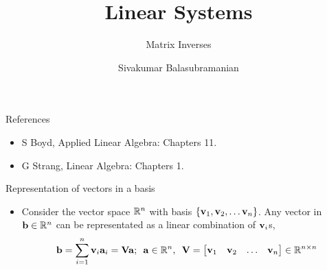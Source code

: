 \documentclass[aspectratio=169]{beamer}
\title{Linear Systems}
\subtitle{Matrix Inverses}
\author{Sivakumar Balasubramanian}
\institute[Christian Medical College] %
{
  \inst{}%
  Department of Bioengineering\\
  Christian Medical College, Bagayam\\
  Vellore 632002
}
\date{}
\def\mf{\ensuremath\mathbf}
\def\mb{\ensuremath\mathbb}
\begin{document}
\begin{frame}
  \titlepage
\end{frame}

\begin{frame}[t]{References}
\begin{itemize}
  \item S Boyd, Applied Linear Algebra: Chapters 11.
  \item G Strang, Linear Algebra: Chapters 1.
\end{itemize}
\end{frame}


\begin{frame}[t]{Representation of vectors in a basis}
\vspace{-0.25cm}
\begin{small}
\begin{itemize}
\item Consider the vector space $\mb{R}^n$ with basis $\left\{\mf{v}_1, \mf{v}_2, \ldots \mf{v}_n\right\}$. Any vector in $\mf{b} \in \mb{R}^n$ can be representated as a linear combination of $\mf{v}_i$s,
\[ \mf{b} = \sum_{i=1}^{n} \mf{v}_i\mf{a}_i = \mf{V}\mf{a}; \,\,\, \mf{a} \in \mb{R}^n, \,\,\, \mf{V} = \begin{bmatrix*}\mf{v}_1 & \mf{v}_2 & \ldots & \mf{v}_n\end{bmatrix*} \in \mb{R}^{n \times n} \]


\end{itemize}
\end{small}
\end{frame}
\end{document}
